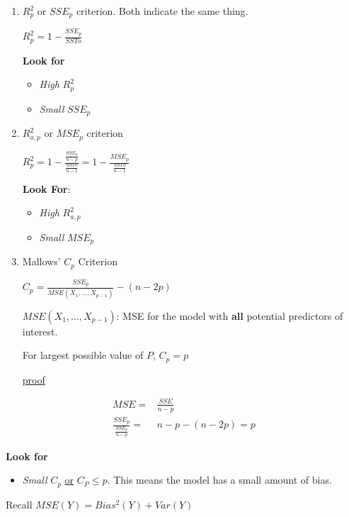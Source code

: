 \documentclass[11pt]{article}
\begin{document}
\begin{enumerate}
\item \(R^2_p\) or \(SSE_p\) criterion. Both indicate the same thing.

\(R_p^2 = 1 -\frac{SSE_p}{SSTo}\)

\textbf{Look for}
\begin{itemize}
\item \emph{High} \(R_p^2\)
\item \emph{Small} \(SSE_p\)
\end{itemize}

\item \(R_{a,p}^2\) or \(MSE_p\) criterion

\(R_p^2 = 1 -\frac{\frac{SSE_p}{n- p}}{\frac{SSTo}{n - 1}} = 1 -
   \frac{MSE_p}{\frac{SSTo}{n - 1}}\)

\textbf{Look For}:
\begin{itemize}
\item \emph{High} \(R_{a,p}^2\)
\item \emph{Small} \(MSE_p\)
\end{itemize}

\item Mallows' \(C_p\) Criterion

\(C_p = \frac{SSE_p}{MSE(X_1, ..., X_{p - 1})} - (n - 2p)\)

\(MSE(X_1, ..., X_{p - 1})\): MSE for the model with \textbf{all} potential predictors
of interest.

For largest possible value of \(P\), \(C_p = p\)

\uline{proof}
\end{enumerate}
\begin{equation}
\begin{split}
MSE = & \frac{SSE}{n - p}\\
\frac{SSE_p}{\frac{SSE_p}{n - p}} = & n - p - (n - 2p) =  p
\end{split}
\end{equation}

\textbf{Look for}
\begin{itemize}
\item \emph{Small} \(C_p\) \uline{or} \(C_P \leq p\). This means the model has a small amount of
bias.
\end{itemize}

Recall \(MSE(Y) = Bias^2(Y) + Var(Y)\)
\end{document}
